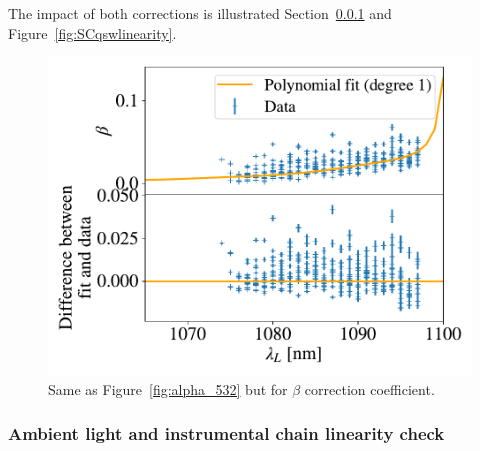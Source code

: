 The impact of both corrections is illustrated Section~\ref{sec:sc_linearity} and Figure~\ref{fig:SCqswlinearity}.


\begin{figure}[h]
    \centering
    \includegraphics[width=\columnwidth]{fig/beta_532_qswMAX.pdf}
    \caption{Same as Figure~\ref{fig:alpha_532} but for $\beta$ correction coefficient.}
    \label{fig:beta}
\end{figure}


\subsubsection{Ambient light and instrumental chain linearity check}\label{sec:sc_linearity}







